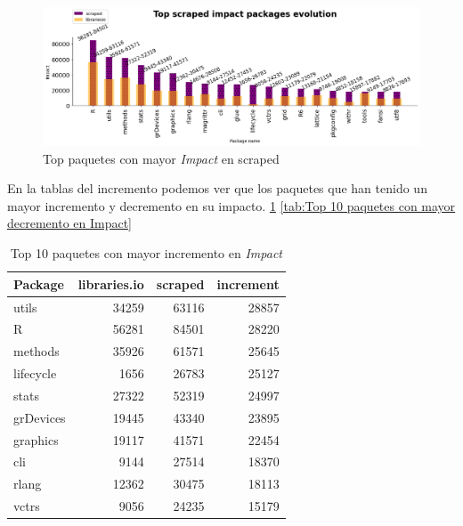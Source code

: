 \begin{figure}[h!]
    \begin{center}
        \includegraphics[width=1\textwidth]{img/cran/impact_top_scraped.png}
        \caption{Top paquetes con mayor \textit{Impact} en scraped}
        \label{fig:Top impact scraped}
    \end{center}
\end{figure}

En la tablas del incremento podemos ver que los paquetes que han tenido un mayor incremento y decremento
en su impacto. \ref{tab:Top 10 paquetes con mayor incremento en Impact} \ref{tab:Top 10 paquetes con mayor decremento en Impact}

\begin{table}
    \begin{center}
        \begin{tabular}{|l|r|r|r|}
            \hline
            \textbf{Package} & \textbf{libraries.io} & \textbf{scraped} & \textbf{increment} \\
            \hline
            utils            & 34259                 & 63116            & 28857              \\
            R                & 56281                 & 84501            & 28220              \\
            methods          & 35926                 & 61571            & 25645              \\
            lifecycle        & 1656                  & 26783            & 25127              \\
            stats            & 27322                 & 52319            & 24997              \\
            grDevices        & 19445                 & 43340            & 23895              \\
            graphics         & 19117                 & 41571            & 22454              \\
            cli              & 9144                  & 27514            & 18370              \\
            rlang            & 12362                 & 30475            & 18113              \\
            vctrs            & 9056                  & 24235            & 15179              \\
            \hline
        \end{tabular}
        \caption{Top 10 paquetes con mayor incremento en \textit{Impact}}
        \label{tab:Top 10 paquetes con mayor incremento en Impact}
    \end{center}
\end{table}

